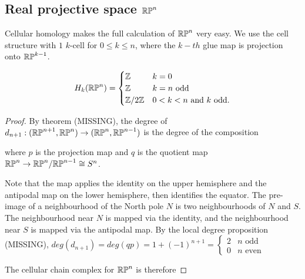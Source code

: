 \subsection{Real projective space $\mathbb{RP}^{n}$}
Cellular homology makes the full calculation of $\mathbb{RP}^{n}$ very easy. We use the cell structure with $1$ $k$-cell for $0\leq k\leq n$, where the $k-th$ glue map is projection onto $\mathbb{RP}^{k-1}$.

\begin{proposition}
$$H_k(\mathbb{RP}^{n})=\begin{cases}\mathbb{Z} & k=0 \\
\mathbb{Z} &k=n \text{ odd}\\
\mathbb{Z}/2\mathbb{Z} & 0<k<n \text{ and } k \text{ odd.} \end{cases}$$
\end{proposition}
\begin{proof}
By theorem (MISSING), the degree of $d_{n+1}:(\mathbb{RP}^{n+1},\mathbb{RP}^{n})\rightarrow (\mathbb{RP}^{n},\mathbb{RP}^{n-1})$ is the degree of the composition

where $p$ is the projection map and $q$ is the quotient map $\mathbb{RP}^{n}\rightarrow \mathbb{RP}^{n}/\mathbb{RP}^{n-1}\cong S^{n}$. 

Note that the map applies the identity on the upper hemisphere and the antipodal map on the lower hemisphere, then identifies the equator. The pre-image of a neighbourhood of the North pole $N$ is two neighbourhoods of $N$ and $S$. The neighbourhood near $N$ is mapped via the identity, and the neighbourhood near $S$ is mapped via the antipodal map. By the local degree proposition (MISSING), $deg(d_{n+1})=deg(qp)=1+(-1)^{n+1}=\begin{cases}2 & n \text{ odd}\\0 & n\text{ even}\end{cases}$

The cellular chain complex for $\mathbb{RP}^{n}$ is therefore



\end{proof}
